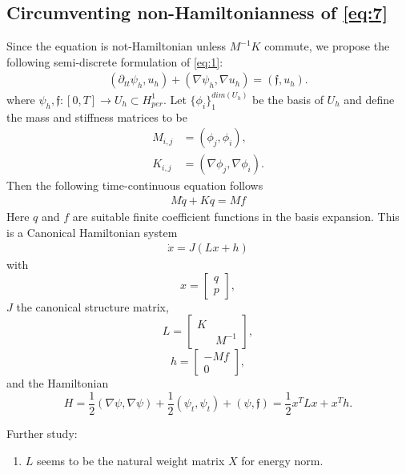 \documentclass[12pt]{article}
\begin{document}
\subsection{Circumventing non-Hamiltonianness of \cref{eq:7}}
Since the equation is not-Hamiltonian unless $M^{-1}K$ commute, we propose the following semi-discrete formulation of \eqref{eq:1}:
\begin{equation}
\begin{aligned}
	(\partial_{tt} \psi_h , u_h) + (\nabla \psi_h, \nabla u_h) = (\mathfrak{f},u_h).
\end{aligned}
\end{equation}
where $\psi_h,\mathfrak{f}:[0,T] \to U_h \subset H^1_{per}$. Let $\{\phi_i\}_1^{dim(U_h)}$ be the basis of $U_h$ and define the mass and stiffness matrices to be
\begin{align}
M_{i,j} &= (\phi_j,\phi_i),\\
K_{i,j} &= (\nabla \phi_j,\nabla \phi_i).
\end{align}
Then the following time-continuous equation follows
\begin{align}
M\ddot q +K q = M f
\end{align}
Here $q$ and $f$ are suitable finite coefficient functions in the basis expansion. This is a Canonical Hamiltonian system
\begin{align}
\dot x = J (Lx + h)
\end{align}
with 
$$x = \begin{bmatrix}
q \\ p
\end{bmatrix},$$ $J$ the canonical structure matrix,
$$L = \begin{bmatrix}
K & \\ & M^{-1}
\end{bmatrix},$$
 $$h = \begin{bmatrix}
-Mf \\ 0
\end{bmatrix},$$
and the Hamiltonian
$$H = \frac{1}{2}(\nabla \psi, \nabla \psi) + \frac{1}{2}(\psi_t,\psi_t) +(\psi,\mathfrak{f})= \frac{1}{2}x^TLx+x^Th.$$

Further study:
\begin{enumerate}
\item $L$ seems to be the natural weight matrix $X$ for energy norm.
\end{enumerate}
\end{document}
